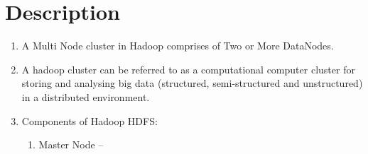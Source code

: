 \documentclass[a4paper,10pt]{article}
\begin{document}
\section{Description}
\begin{enumerate}
	\item A Multi Node cluster in Hadoop comprises of Two or More DataNodes.
	\item A hadoop cluster can be referred to as a computational computer cluster for storing and analysing big data (structured, semi-structured and unstructured) in a distributed environment.
	\item Components of Hadoop HDFS:
	\begin{enumerate}
		\item Master Node – 
		\begin{itemize}
			

\end{itemize}
\end{enumerate}
\end{enumerate}
\end{document}
